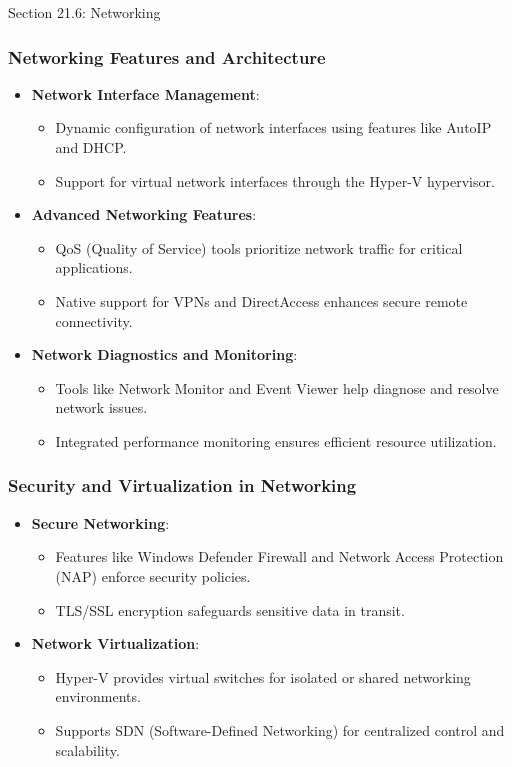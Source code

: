 \begin{notes}{Section 21.6: Networking}
    \subsubsection*{Networking Features and Architecture}
    \begin{itemize}
        \item \textbf{Network Interface Management}:
        \begin{itemize}
            \item Dynamic configuration of network interfaces using features like AutoIP and DHCP.
            \item Support for virtual network interfaces through the Hyper-V hypervisor.
        \end{itemize}
        \item \textbf{Advanced Networking Features}:
        \begin{itemize}
            \item QoS (Quality of Service) tools prioritize network traffic for critical applications.
            \item Native support for VPNs and DirectAccess enhances secure remote connectivity.
        \end{itemize}
        \item \textbf{Network Diagnostics and Monitoring}:
        \begin{itemize}
            \item Tools like Network Monitor and Event Viewer help diagnose and resolve network issues.
            \item Integrated performance monitoring ensures efficient resource utilization.
        \end{itemize}
    \end{itemize}
    
    \subsubsection*{Security and Virtualization in Networking}
    \begin{itemize}
        \item \textbf{Secure Networking}:
        \begin{itemize}
            \item Features like Windows Defender Firewall and Network Access Protection (NAP) enforce security policies.
            \item TLS/SSL encryption safeguards sensitive data in transit.
        \end{itemize}
        \item \textbf{Network Virtualization}:
        \begin{itemize}
            \item Hyper-V provides virtual switches for isolated or shared networking environments.
            \item Supports SDN (Software-Defined Networking) for centralized control and scalability.
        \end{itemize}
    \end{itemize}
    

\end{notes}

